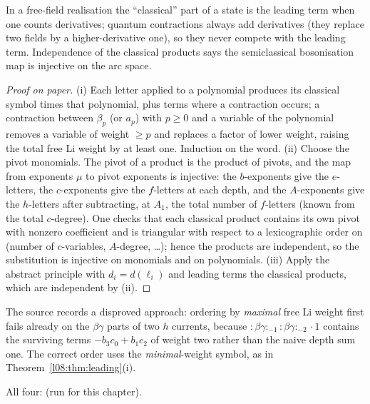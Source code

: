 \begin{physics}
In a free-field realisation the ``classical'' part of a state is the leading term when one counts
derivatives; quantum contractions always add derivatives (they replace two fields by a
higher-derivative one), so they never compete with the leading term. Independence of the classical
products says the semiclassical bosonisation map is injective on the arc space.
\end{physics}

\begin{proof}[Proof on paper]
(i) Each letter applied to a polynomial produces its classical symbol times that polynomial, plus
terms where a contraction occurs; a contraction between $\beta_p$ (or $a_p$) with $p\ge0$ and a variable
of the polynomial removes a variable of weight $\ge p$ and replaces a factor of lower weight, raising
the total free Li weight by at least one. Induction on the word.
(ii) Choose the pivot monomials. The pivot of a product is the product of pivots, and the map from
exponents $\mu$ to pivot exponents is injective: the $b$-exponents give the $e$-letters, the
$c$-exponents give the $f$-letters at each depth, and the $A$-exponents give the $h$-letters after
subtracting, at $A_1$, the total number of $f$-letters (known from the total $c$-degree). One checks
that each classical product contains its own pivot with nonzero coefficient and is triangular with
respect to a lexicographic order on (number of $c$-variables, $A$-degree, \ldots); hence the products
are independent, so the substitution is injective on monomials and on polynomials.
(iii) Apply the abstract principle with $d_i = d(\ell_i)$ and leading terms the classical products,
which are independent by (ii).
\end{proof}

\begin{warning}[title={A tempting order that fails}]
The source records a disproved approach: ordering by \emph{maximal} free Li weight first fails
already on the $\beta\gamma$ parts of two $h$ currents, because ${:}\beta\gamma{:}_{-1}{:}\beta\gamma{:}_{-2}\cdot1$ contains the surviving terms
$-b_3c_0 + b_1c_2$ of weight two rather than the naive depth sum one. The correct order uses the
\emph{minimal}-weight symbol, as in Theorem~\ref{l08:thm:leading}(i).
\end{warning}

\begin{status}
All four: \lean{[propext, Classical.}\allowbreak{}\allowbreak\lean{sound]} (run for this chapter).
\end{status}

